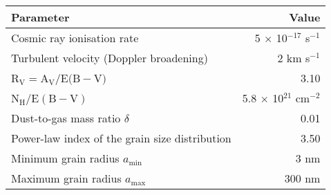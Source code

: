 \begin{tabular}{lr}
 \hline\hline
 Parameter & Value \\
 \hline
 Cosmic ray ionisation rate & 5 $\times$ 10$^\mathrm{-17}$ s$^\mathrm{-1}$ \\
 Turbulent velocity (Doppler broadening) & 2 km s$^\mathrm{-1}$ \\
 R$_\mathrm{V} = \mathrm{A}_\mathrm{V} / \mathrm{E(B-V})$ & 3.10 \\
 N$_\mathrm{H} / \mathrm{E(B-V)}$ & 5.8 $\times$ 10$^\mathrm{21}$ cm$^\mathrm{-2}$ \\
 Dust-to-gas mass ratio $\delta$ & 0.01 \\
 Power-law index of the grain size distribution & 3.50 \\
 Minimum grain radius $a_\mathrm{min}$ & 3 nm \\
 Maximum grain radius $a_\mathrm{max}$ & 300 nm \\
 \hline
\end{tabular}
